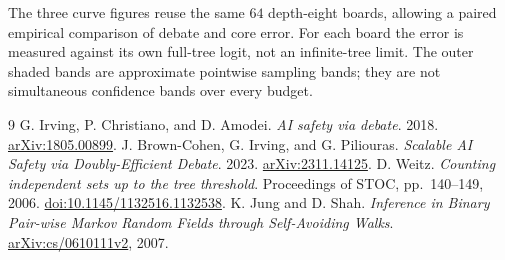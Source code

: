\documentclass[11pt]{article}
\theoremstyle{definition}
\theoremstyle{remark}
\begin{document}
The three curve figures reuse the same $64$ depth-eight boards, allowing
a paired empirical comparison of debate and core error. For each board the
error is measured against its own full-tree logit, not an infinite-tree
limit. The outer shaded bands are approximate pointwise sampling bands;
they are not simultaneous confidence bands over every budget.

\begin{thebibliography}{9}
G. Irving, P. Christiano, and D. Amodei.
\emph{AI safety via debate}. 2018.
\href{https://arxiv.org/abs/1805.00899}{arXiv:1805.00899}.
J. Brown-Cohen, G. Irving, and G. Piliouras.
\emph{Scalable AI Safety via Doubly-Efficient Debate}. 2023.
\href{https://arxiv.org/abs/2311.14125}{arXiv:2311.14125}.
D. Weitz. \emph{Counting independent sets up to the tree threshold}.
Proceedings of STOC, pp.~140--149, 2006.
\href{https://doi.org/10.1145/1132516.1132538}{doi:10.1145/1132516.1132538}.
K. Jung and D. Shah. \emph{Inference in Binary Pair-wise Markov Random
Fields through Self-Avoiding Walks}.
\href{https://arxiv.org/abs/cs/0610111v2}{arXiv:cs/0610111v2}, 2007.
\end{thebibliography}
\end{document}
